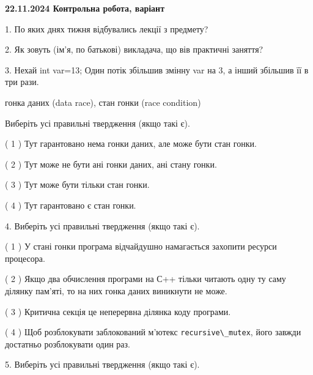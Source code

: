 \documentclass[12pt, ukrainian]{article}
\def\code#1{\Verb!#1!}
\begin{document}
\vspace{4mm}
\newpage
\begin {large}

\textbf{22.11.2024 Контрольна робота, варіант  }\par


{
1. По яких днях тижня відбувались лекції з предмету?



\vspace{5mm}
2. Як зовуть (ім'я, по батькові) викладача, що вів практичні заняття?



\vspace{5mm}
3. Нехай int var=13; Один потік збільшив змінну var на 3, а інший збільшив її в три рази.

гонка даних (data race), стан гонки (race condition)

Виберіть усі правильні твердження (якщо такі є).\par
\vspace{2mm}
( 1 ) Тут гарантовано нема гонки даних, але може бути стан гонки.%

( 2 ) Тут може не бути ані гонки даних, ані стану гонки.%

( 3 ) Тут може бути тільки стан гонки.%

( 4 ) Тут гарантовано є стан гонки.%


\vspace{5mm}
4. Виберіть усі правильні твердження (якщо такі є).\par
\vspace{2mm}

( 1 ) У стані гонки програма відчайдушно намагається захопити ресурси процесора.%

( 2 ) Якщо два обчислення програми на С++ тільки читають одну ту саму ділянку пам'яті, то на них гонка даних  виникнути не може.%

( 3 ) Критична секція це неперервна ділянка коду програми.%

( 4 ) Щоб розблокувати заблокований м’ютекс \code{recursive\_mutex}, його завжди достатньо розблокувати один раз.%


\vspace{5mm}
5. Виберіть усі правильні твердження (якщо такі є).\par
\vspace{2mm}

}
\end{large}
\end{document}
